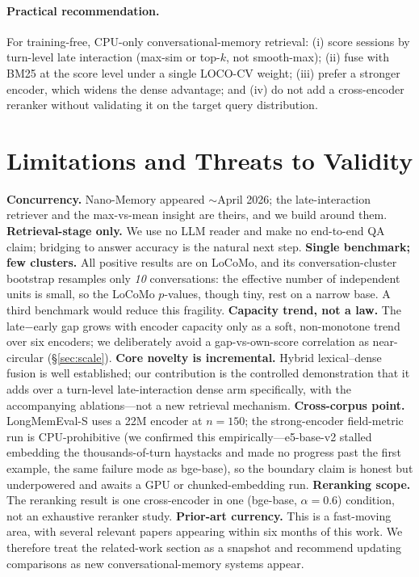\documentclass[10pt,twocolumn]{article}
\begin{document}
\paragraph{Practical recommendation.}
For training-free, CPU-only conversational-memory retrieval: (i) score
sessions by turn-level late interaction (max-sim or top-$k$, not smooth-max);
(ii) fuse with BM25 at the score level under a single LOCO-CV weight;
(iii) prefer a stronger encoder, which widens the dense advantage; and
(iv) do not add a cross-encoder reranker without validating it on the target
query distribution.

\section{Limitations and Threats to Validity}
\label{sec:limits}
\textbf{Concurrency.} Nano-Memory \citep{nanomemory} appeared $\sim$April 2026;
the late-interaction retriever and the max-vs-mean insight are theirs, and we
build around them. \textbf{Retrieval-stage only.} We use no LLM reader and make
no end-to-end QA claim; bridging to answer accuracy is the natural next step.
\textbf{Single benchmark; few clusters.} All positive results are on LoCoMo,
and its conversation-cluster bootstrap resamples only \emph{10} conversations:
the effective number of independent units is small, so the LoCoMo $p$-values,
though tiny, rest on a narrow base. A third benchmark would reduce this
fragility. \textbf{Capacity trend, not a law.} The late$-$early gap grows with
encoder capacity only as a soft, non-monotone trend over six encoders; we
deliberately avoid a gap-vs-own-score correlation as near-circular
(\S\ref{sec:scale}). \textbf{Core novelty is incremental.} Hybrid
lexical--dense fusion is well established; our contribution is the controlled
demonstration that it adds over a turn-level late-interaction dense arm
specifically, with the accompanying ablations---not a new retrieval mechanism.
\textbf{Cross-corpus point.} LongMemEval-S uses a 22M encoder at $n{=}150$; the
strong-encoder field-metric run is CPU-prohibitive (we confirmed this
empirically---e5-base-v2 stalled embedding the thousands-of-turn haystacks and
made no progress past the first example, the same failure mode as bge-base), so
the boundary claim is honest but underpowered and awaits a GPU or
chunked-embedding run. \textbf{Reranking scope.} The
reranking result is one cross-encoder in one (bge-base, $\alpha{=}0.6$)
condition, not an exhaustive reranker study. \textbf{Prior-art currency.} This is a fast-moving area, with several relevant
papers appearing within six months of this work. We therefore treat the
related-work section as a snapshot and recommend updating comparisons as new
conversational-memory systems appear.
\end{document}
